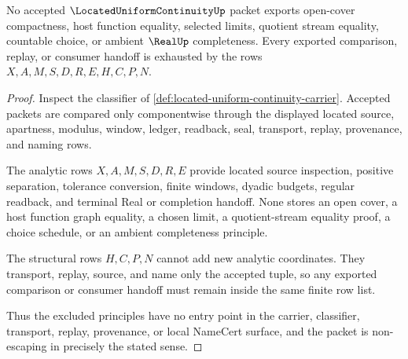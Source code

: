 \begin{theorem}
\label{thm:located-uniform-continuity-nonescape}
No accepted $\LocatedUniformContinuityUp$ packet exports open-cover compactness, host function equality, selected limits, quotient stream equality, countable choice, or ambient $\RealUp$ completeness. Every exported comparison, replay, or consumer handoff is exhausted by the rows $X,A,M,S,D,R,E,H,C,P,N$.
\end{theorem}
\begin{proof}
Inspect the classifier of \autoref{def:located-uniform-continuity-carrier}. Accepted packets are compared only componentwise through the displayed located source, apartness, modulus, window, ledger, readback, seal, transport, replay, provenance, and naming rows.

The analytic rows $X,A,M,S,D,R,E$ provide located source inspection, positive separation, tolerance conversion, finite windows, dyadic budgets, regular readback, and terminal Real or completion handoff. None stores an open cover, a host function graph equality, a chosen limit, a quotient-stream equality proof, a choice schedule, or an ambient completeness principle.

The structural rows $H,C,P,N$ cannot add new analytic coordinates. They transport, replay, source, and name only the accepted tuple, so any exported comparison or consumer handoff must remain inside the same finite row list.

Thus the excluded principles have no entry point in the carrier, classifier, transport, replay, provenance, or local NameCert surface, and the packet is non-escaping in precisely the stated sense.
\end{proof}


